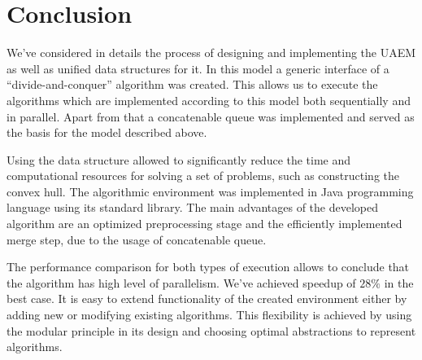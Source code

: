\documentclass[conference]{IEEEtran}
\begin{document}
\section{Conclusion}
\label{sec:coclusion}

	We've considered in details the process of designing and implementing the UAEM as well as unified data structures for it. In this model a generic interface of a ``divide-and-conquer'' algorithm was created. This allows us to execute the algorithms which are implemented according to this model both sequentially and in parallel. Apart from that a concatenable queue was implemented and served as the basis for the model described above.
	
	Using the data structure allowed to significantly reduce the time and computational resources for solving a set of problems, such as constructing the convex hull. The algorithmic environment was implemented in Java programming language using its standard library. The main advantages of the developed algorithm are an optimized preprocessing stage and the efficiently implemented merge step, due to the usage of concatenable queue.
	
	The performance comparison for both types of execution allows to conclude that the algorithm has high level of parallelism. We've achieved speedup of $28\%$ in the best case. It is easy to extend functionality of the created environment either by adding new or modifying existing algorithms. This flexibility is achieved by using the modular principle in its design and choosing optimal abstractions to represent algorithms.




\end{document}
